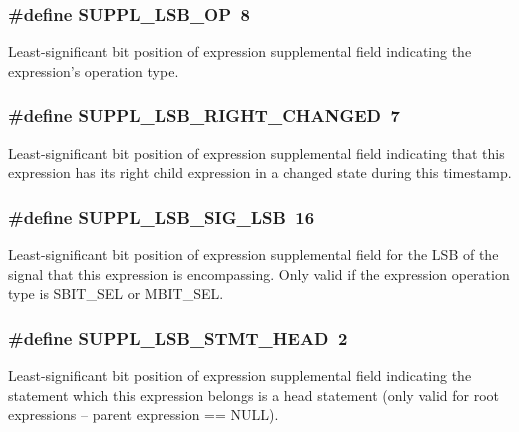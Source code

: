 \subsubsection{\setlength{\rightskip}{0pt plus 5cm}\#define SUPPL\_\-LSB\_\-OP\ 8}\label{group__expr__suppl_a8}


Least-significant bit position of expression supplemental field indicating the expression's operation type. 
\subsubsection{\setlength{\rightskip}{0pt plus 5cm}\#define SUPPL\_\-LSB\_\-RIGHT\_\-CHANGED\ 7}\label{group__expr__suppl_a7}


Least-significant bit position of expression supplemental field indicating that this expression has its right child expression in a changed state during this timestamp. 
\subsubsection{\setlength{\rightskip}{0pt plus 5cm}\#define SUPPL\_\-LSB\_\-SIG\_\-LSB\ 16}\label{group__expr__suppl_a9}


Least-significant bit position of expression supplemental field for the LSB of the signal that this expression is encompassing. Only valid if the expression operation type is SBIT\_\-SEL or MBIT\_\-SEL. 
\subsubsection{\setlength{\rightskip}{0pt plus 5cm}\#define SUPPL\_\-LSB\_\-STMT\_\-HEAD\ 2}\label{group__expr__suppl_a2}


Least-significant bit position of expression supplemental field indicating the statement which this expression belongs is a head statement (only valid for root expressions -- parent expression == NULL). 
